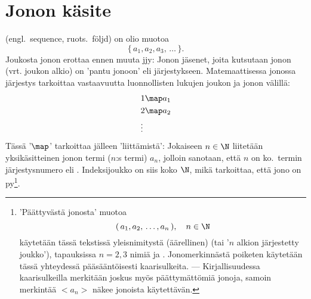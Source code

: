 
\section{Jonon käsite} \label{jono}
\alku

%
 (engl.\ sequence, ruots.\ följd) on olio muotoa
\[
\{\,a_1, a_2, a_3,\,\ldots\,\}.
\]
Joukosta jonon erottaa ennen muuta jjy: Jonon jäsenet, joita 
%
kutsutaan jonon  (vrt. joukon alkio) on 'pantu jonoon' eli järjestykseen. 
Matemaattisessa jonossa järjestys tarkoittaa vastaavuutta luonnollisten lukujen joukon ja jonon
välillä:
\begin{align*}
&1 \map a_1 \\
&2 \map a_2 \\
&\vdots
\end{align*}
Tässä '$\map$' tarkoittaa jälleen 'liittämistä': Jokaiseen $n \in \N$ liitetään yksikäsitteinen 
jonon termi ($n$:s termi) $a_n$, jolloin sanotaan, että $n$ on ko.\ termin järjestysnumero eli 
%
. Indeksijoukko on siis koko $\N$, mikä tarkoittaa, että jono on 
py\footnote[2]{'Päättyvästä jonosta' muotoa
\[
(\,a_1, a_2,\,\ldots, a_n\,), \quad n \in \N
\]
käytetään tässä tekstissä yleisnimitystä (äärellinen)  (tai '$n$ alkion
järjestetty joukko'), tapauksissa $n=2,3$ nimiä  ja . Jonomerkinnästä
poiketen käytetään tässä yhteydessä pääsääntöisesti kaarisulkeita. --- Kirjallisuudessa 
kaarisulkeilla merkitään joskus myös päättymättömiä jonoja, samoin merkintää $<a_n>$ näkee 
jonoista käytettävän.   }.

